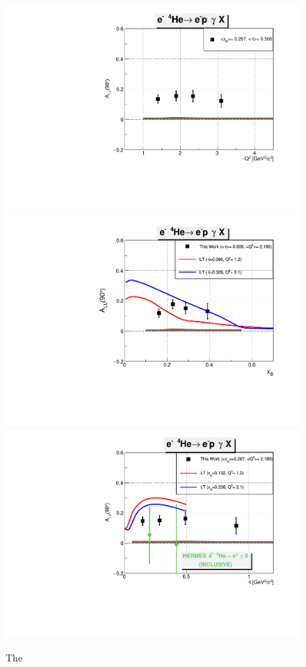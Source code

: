 \begin{figure}[tpb]
\centering
\vspace{-0.2in}
\includegraphics[scale=0.37]{fig_updated/f_incoh_alu_Q2_90.pdf} \\
\vspace{-0.1in}
\includegraphics[scale=0.37]{fig_updated/f_incoh_alu_xB_90.pdf}\\ 
\vspace{-0.1in}
\includegraphics[scale=0.37]{fig_updated/f_incoh_alu_t_90.pdf} \caption{The 
}
\end{figure}
